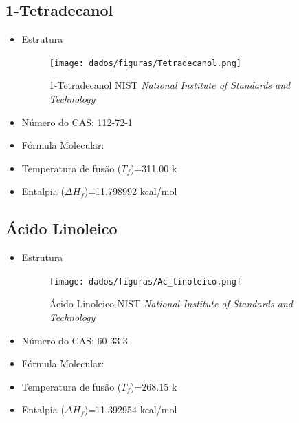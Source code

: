 	\subsection{1-Tetradecanol}
	\label{sec:5}
	\begin{itemize}
		\item Estrutura
		\begin{figure}[H]
			\centering
			\texttt{[image: dados/figuras/Tetradecanol.png]}
			\caption[1-Tetradecanol]{1-Tetradecanol  NIST \textit{National Institute of Standards and Technology}}
			\label{fig:nist4}
		\end{figure}
		\item Número do CAS: 112-72-1
		\item Fórmula Molecular:
		\item Temperatura de fusão ($T_f$)=311.00 k
		\item Entalpia ($\Delta H_{f}$)=11.798992 kcal/mol
	\end{itemize}
	
	\subsection{Ácido Linoleico}
	\label{sec:6}
	\begin{itemize}
		\item Estrutura
		\begin{figure}[H]
			\centering
			\texttt{[image: dados/figuras/Ac\_linoleico.png]}
			\caption[Ácido Linoleico]{Ácido Linoleico NIST \textit{National Institute of Standards and Technology}}
			\label{fig:nist5}
		\end{figure}
		\item Número do CAS: 60-33-3
		\item Fórmula Molecular:
		\item Temperatura de fusão ($T_f$)=268.15 k
		\item Entalpia ($\Delta H_{f}$)=11.392954 kcal/mol
	\end{itemize}
	